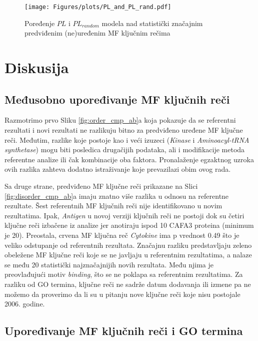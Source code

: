\begin{figure}[th]
\hspace*{-3.0cm} 
\texttt{[image: Figures/plots/PL\_and\_PL\_rand.pdf]}
\caption {
  Poređenje $PL$ i $PL_{random}$ modela nad statistički značajnim predviđenim (ne)uređenim MF ključnim rečima
}
\label{fig:PLrand}
\end{figure}




\chapter{Diskusija} %

\label{Diskusija} %

\section{Međusobno upoređivanje MF ključnih reči}

Razmotrimo prvo Sliku \ref{fig:order_cmp_ab}a koja pokazuje da se referentni
rezultati i novi rezultati ne razlikuju bitno za predviđeno uređene MF ključne
reči. Međutim, razlike koje postoje kao i veći izuzeci (\textit{Kinase} i
\textit{Aminoacyl-tRNA synthetase})  mogu biti posledica drugačijih podataka,
ali i modifikacije metoda referentne analize ili čak kombinacije oba faktora.
Pronalaženje egzaktnog uzroka ovih razlika zahteva dodatno istraživanje koje
prevazilazi obim ovog rada.

Sa druge strane, predviđeno  MF ključne reči prikazane na
Slici \ref{fig:disorder_cmp_ab}a imaju znatno više razlika u odnosu na
referentne rezultate.  Šest referentnih MF ključnih reči nije identifikovano u
novim rezultatima. Ipak, \textit{Antigen} u novoj verziji ključnih reči ne
postoji dok su četiri ključne reči izbačene iz analize jer anotiraju ispod 10
CAFA3 proteina (minimum je 20).  Preostala, crvena MF ključna reč
\textit{Cytokine} ima p vrednost 0.49 što je veliko odstupanje od referentnih
rezultata. Značajnu razliku predstavljaju zeleno obeležene MF ključne reči koje
se ne javljaju u referentnim rezultatima, a nalaze se među 20 statistički
najznačajnijih novih rezultata. Među njima je preovlađujući motiv \textit{binding}, 
što se ne poklapa sa referentnim rezultatima. Za razliku od GO termina,
ključne reči ne sadrže datum dodavanja ili izmene pa ne možemo da proverimo da
li su u pitanju nove ključne reči koje nisu postojale 2006. godine.


\section{Upoređivanje MF ključnih reči i GO termina}

